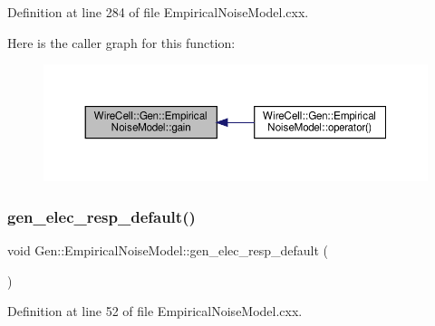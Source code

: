 Definition at line 284 of file Empirical\+Noise\+Model.\+cxx.

Here is the caller graph for this function\+:
\nopagebreak
\begin{figure}[H]
\begin{center}
\leavevmode
\includegraphics[width=350pt]{class_wire_cell_1_1_gen_1_1_empirical_noise_model_a783b81a925de0823c63ade8b242033e8_icgraph}
\end{center}
\end{figure}
\mbox{\label{class_wire_cell_1_1_gen_1_1_empirical_noise_model_abf5f2823eb9522997306417ddd1d9ca4}} 
\subsubsection{\texorpdfstring{gen\+\_\+elec\+\_\+resp\+\_\+default()}{gen\_elec\_resp\_default()}}
{\footnotesize\ttfamily void Gen\+::\+Empirical\+Noise\+Model\+::gen\+\_\+elec\+\_\+resp\+\_\+default (\begin{DoxyParamCaption}{ }\end{DoxyParamCaption})}



Definition at line 52 of file Empirical\+Noise\+Model.\+cxx.

